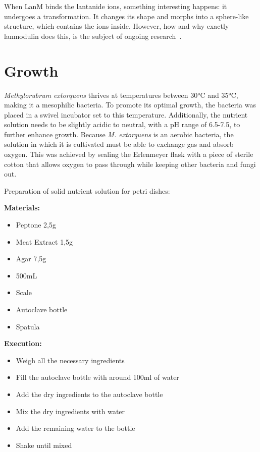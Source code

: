 When LanM binds the lantanide ions, something interesting happens: it undergoes a transformation.
It changes its shape and morphs into a sphere-like structure, which contains the ions inside.
However, how and why exactly lanmodulin does this, is the subject of ongoing research~\cite{lanmongoingresearch}.

\section{Growth\authorB}
\emph{Methylorubrum extorquens} thrives at temperatures between 30°C and 35°C, making it a
mesophilic bacteria.
To promote its optimal growth, the bacteria was placed in a swivel
incubator set to this temperature.
Additionally, the nutrient solution needs to be slightly acidic to neutral, with a pH range of 6.5-7.5, to further enhance growth.
Because \emph{M. extorquens} is an aerobic bacteria, the solution in which it is cultivated must be able to exchange gas and absorb oxygen.
This was achieved by sealing the Erlenmeyer flask with a piece of sterile cotton that allows oxygen to pass through while keeping other bacteria and fungi out.

Preparation of solid nutrient solution for petri dishes:

\textbf{Materials:}

\begin{itemize}
    \item Peptone 2,5g
    \item Meat Extract 1,5g
    \item Agar 7,5g
    \item {} 500mL
    \item Scale
    \item Autoclave bottle
    \item Spatula
\end{itemize}


\textbf{Execution:}
\begin{itemize}
    \item Weigh all the necessary ingredients
    \item Fill the autoclave bottle with around 100ml of water
    \item Add the dry ingredients to the autoclave bottle
    \item Mix the dry ingredients with water
    \item Add the remaining water to the bottle
    \item Shake until mixed
\end{itemize}


